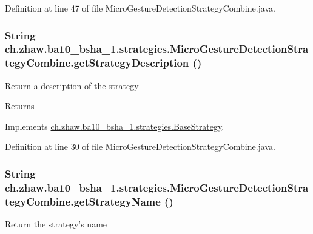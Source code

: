 Definition at line 47 of file MicroGestureDetectionStrategyCombine.java.\hypertarget{classch_1_1zhaw_1_1ba10__bsha__1_1_1strategies_1_1MicroGestureDetectionStrategyCombine_adf4547ec5056bf340c60f15ba50330bc}{
\subsubsection[{getStrategyDescription}]{\setlength{\rightskip}{0pt plus 5cm}String ch.zhaw.ba10\_\-bsha\_\-1.strategies.MicroGestureDetectionStrategyCombine.getStrategyDescription ()}}
\label{classch_1_1zhaw_1_1ba10__bsha__1_1_1strategies_1_1MicroGestureDetectionStrategyCombine_adf4547ec5056bf340c60f15ba50330bc}
Return a description of the strategy

\begin{DoxyReturn}{Returns}

\end{DoxyReturn}


Implements \hyperlink{classch_1_1zhaw_1_1ba10__bsha__1_1_1strategies_1_1BaseStrategy_a75fdb36932ad701f6375cc1fe718056b}{ch.zhaw.ba10\_\-bsha\_\-1.strategies.BaseStrategy}.

Definition at line 30 of file MicroGestureDetectionStrategyCombine.java.\hypertarget{classch_1_1zhaw_1_1ba10__bsha__1_1_1strategies_1_1MicroGestureDetectionStrategyCombine_ad7fdf02bda8daf2d3bd177e23a270f11}{
\subsubsection[{getStrategyName}]{\setlength{\rightskip}{0pt plus 5cm}String ch.zhaw.ba10\_\-bsha\_\-1.strategies.MicroGestureDetectionStrategyCombine.getStrategyName ()}}
\label{classch_1_1zhaw_1_1ba10__bsha__1_1_1strategies_1_1MicroGestureDetectionStrategyCombine_ad7fdf02bda8daf2d3bd177e23a270f11}
Return the strategy's name

